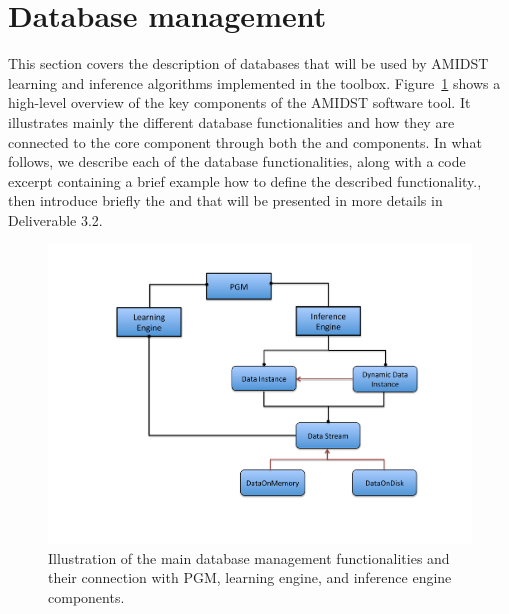 \section{Database management} \label{sec:DataBases}

This section covers the description of databases that will be used by AMIDST learning and inference algorithms implemented in the toolbox.  Figure~\ref{fig:DataBase} shows a high-level overview of the key components of the AMIDST software tool. It illustrates mainly the different database functionalities and how they are connected to the core component  through both the  and  components. In what follows, we describe each of the database functionalities, along with a code excerpt containing a brief example how to define the described functionality., then introduce briefly the  and  that will be presented in more details in Deliverable 3.2.

  \begin{figure}[htbp]
    \centering
    \includegraphics[width=1.05\linewidth]{./figures/DataBase}
    \caption{Illustration of the main database management functionalities and their connection with PGM, learning engine, and inference engine components. }
    \label{fig:DataBase}
  \end{figure}
 
